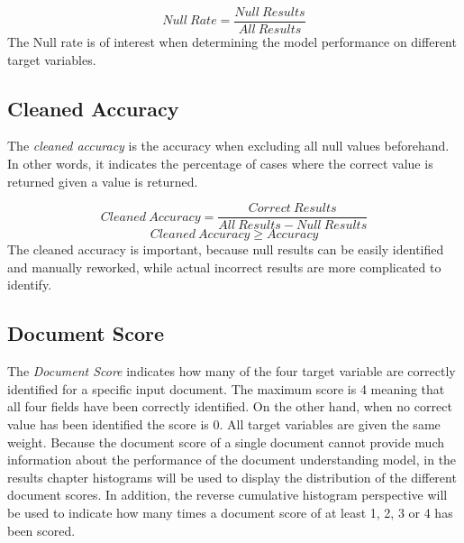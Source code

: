 \[ Null \ Rate = \frac{Null \ Results}{All \ Results}\]
The Null rate is of interest when determining the model performance on different target variables.
\subsection{Cleaned Accuracy}
The \textit{cleaned accuracy} is the accuracy when excluding all null values beforehand. In other words, it indicates the percentage of cases where the correct value is returned given a value is returned.

\[ Cleaned \ Accuracy = \frac{Correct \ Results}{All \ Results - Null \ Results}\] 
\[Cleaned \ Accuracy \geq Accuracy\]
The cleaned accuracy is important, because null results can be easily identified and manually reworked, while actual incorrect results are more complicated to identify.
\subsection{Document Score}
The \textit{Document Score} indicates how many of the four target variable are correctly identified for a specific input document.
The maximum score is 4 meaning that all four fields have been correctly identified. On the other hand, when no correct value has been identified
the score is 0. All target variables are given the same weight.
Because the document score of a single document cannot provide much information about the performance of the document understanding model, in the results chapter histograms will be used to display the distribution of the different document scores. In addition, the reverse cumulative histogram perspective will be used to indicate how many times a document score of at least 1, 2, 3 or 4 has been scored.